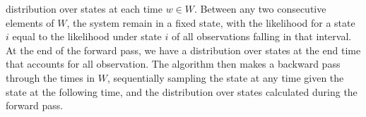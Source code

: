 \begin{algorithm}[H]
\begin{algorithmic}[1]
    distribution over states at each time $w \in W$. 
    Between any two consecutive elements of $W$,
    the system remain in a fixed state, with the likelihood for a state $i$ equal
    to the likelihood under state $i$ of all observations 
    falling in that interval. 
    At the end of the forward pass, we have a distribution over states at the
    end time that accounts for all observation.
    The algorithm then makes a backward pass through the times in $W$, 
    sequentially sampling the state at any time given the state at the 
    following time, and the distribution over states calculated during the
    forward pass. 
\end{algorithmic}
\end{algorithm}

